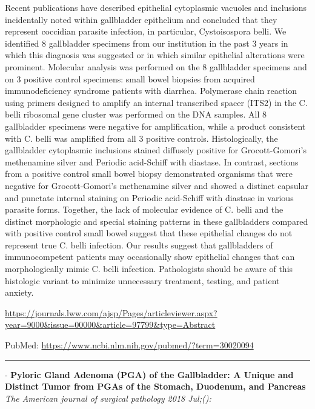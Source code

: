 \documentclass[]{article}
\begin{document}
Recent publications have described epithelial cytoplasmic vacuoles and
inclusions incidentally noted within gallbladder epithelium and
concluded that they represent coccidian parasite infection, in
particular, Cystoisospora belli. We identified 8 gallbladder specimens
from our institution in the past 3 years in which this diagnosis was
suggested or in which similar epithelial alterations were prominent.
Molecular analysis was performed on the 8 gallbladder specimens and on 3
positive control specimens: small bowel biopsies from acquired
immunodeficiency syndrome patients with diarrhea. Polymerase chain
reaction using primers designed to amplify an internal transcribed
spacer (ITS2) in the C. belli ribosomal gene cluster was performed on
the DNA samples. All 8 gallbladder specimens were negative for
amplification, while a product consistent with C. belli was amplified
from all 3 positive controls. Histologically, the gallbladder
cytoplasmic inclusions stained diffusely positive for Grocott-Gomori's
methenamine silver and Periodic acid-Schiff with diastase. In contrast,
sections from a positive control small bowel biopsy demonstrated
organisms that were negative for Grocott-Gomori's methenamine silver and
showed a distinct capsular and punctate internal staining on Periodic
acid-Schiff with diastase in various parasite forms. Together, the lack
of molecular evidence of C. belli and the distinct morphologic and
special staining patterns in these gallbladders compared with positive
control small bowel suggest that these epithelial changes do not
represent true C. belli infection. Our results suggest that gallbladders
of immunocompetent patients may occasionally show epithelial changes
that can morphologically mimic C. belli infection. Pathologists should
be aware of this histologic variant to minimize unnecessary treatment,
testing, and patient anxiety.

\url{https://journals.lww.com/ajsp/Pages/articleviewer.aspx?year=9000\&issue=00000\&article=97799\&type=Abstract}

PubMed: \url{https://www.ncbi.nlm.nih.gov/pubmed/?term=30020094}

{}

{}

\begin{center}\rule{0.5\linewidth}{\linethickness}\end{center}

 - \textbf{Pyloric Gland Adenoma (PGA) of the Gallbladder: A Unique and
Distinct Tumor from PGAs of the Stomach, Duodenum, and Pancreas}
\emph{The American journal of surgical pathology 2018 Jul;():}
\end{document}
